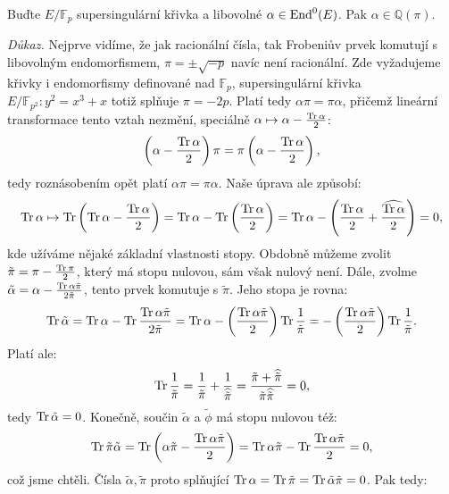 \documentclass[12pt]{report}
\begin{document}
\begin{veta}
Buďte $E/\mathbb{F}_p$ supersingulární křivka a libovolné $\alpha \in \operatorname{End}^0 (E)$. Pak $\alpha \in \mathbb{Q}(\pi)$.
\end{veta}
\noindent \textit{Důkaz.} Nejprve vidíme, že jak racionální čísla, tak Frobeniův prvek komutují s libovolným endomorfismem, $\pi = \pm \sqrt{-p}$ navíc není racionální. Zde vyžadujeme křivky i endomorfismy definované nad $\mathbb{F}_p$, supersingulární křivka $E/\mathbb{F}_{p^2} : y^2 = x^3+x$ totiž splňuje $\pi = -2p$. Platí tedy $\alpha \pi =  \pi \alpha$, přičemž lineární transformace tento vztah nezmění, speciálně $\alpha \mapsto \alpha - \frac{\operatorname{Tr} \alpha}{2}$:
\begin{equation*}
\left( \alpha - \frac{\operatorname{Tr} \alpha}{2} \right) \pi = \pi \left( \alpha - \frac{\operatorname{Tr} \alpha}{2} \right),
\end{equation*}
tedy roznásobením opět platí $\alpha \pi = \pi \alpha$. Naše úprava ale způsobí: $$\operatorname{Tr} \alpha \mapsto \operatorname{Tr} \left(\operatorname{Tr} \alpha - \frac{\operatorname{Tr} \alpha}{2} \right) = \operatorname{Tr} \alpha - \operatorname{Tr} \left( \frac{\operatorname{Tr} \alpha}{2} \right) = \operatorname{Tr} \alpha - \left(\frac{\operatorname{Tr} \alpha}{2} + \frac{\widehat{\operatorname{Tr} \alpha}}{2} \right) = 0,$$
kde užíváme nějaké základní vlastnosti stopy. Obdobně můžeme zvolit $\tilde{\pi} = \pi - \frac{\operatorname{Tr} \pi}{2}$, který má stopu nulovou, sám však nulový není. Dále, zvolme $\tilde{\alpha} = \alpha - \frac{\operatorname{Tr} \alpha \tilde{\pi}}{2 \tilde{\pi}}$, tento prvek komutuje s $\tilde{\pi}$. Jeho stopa je rovna:
\begin{equation*}
\operatorname{Tr} \tilde{\alpha} = \operatorname{Tr} \alpha - \operatorname{Tr} \frac{\operatorname{Tr} \alpha \tilde{\pi}}{2 \tilde{\pi}} = \operatorname{Tr} \alpha - \left( \frac{\operatorname{Tr} \alpha \tilde{\pi}}{2}\right) \operatorname{Tr} \frac{1}{\tilde{\pi}} = -\left( \frac{\operatorname{Tr} \alpha \tilde{\pi}}{2}\right) \operatorname{Tr} \frac{1}{\tilde{\pi}}.
\end{equation*}
Platí ale:
\begin{equation*}
\operatorname{Tr} \frac{1}{\tilde{\pi}} = \frac{1}{\tilde{\pi}} + \frac{1}{\widehat{\tilde{\pi}}} = \frac{\tilde{\pi} + \widehat{\tilde{\pi}}}{\tilde{\pi} \widehat{\tilde{\pi}}} = 0,
\end{equation*}
tedy $\operatorname{Tr} \tilde{\alpha} = 0$. Konečně, součin $\tilde{\alpha}$ a $\tilde{\phi}$ má stopu nulovou též:
\begin{equation*}
\operatorname{Tr} \tilde{\pi} \tilde{\alpha} = \operatorname{Tr} \left( \alpha \tilde{\pi} - \frac{\operatorname{Tr} \alpha \tilde{\pi}}{2} \right) = \operatorname{Tr} \alpha \tilde{\pi} - \operatorname{Tr} \frac{\operatorname{Tr} \alpha \tilde{\pi}}{2} = 0,
\end{equation*}
což jsme chtěli. Čísla $\tilde{\alpha}, \tilde{\pi}$ proto splňující $\operatorname{Tr} \alpha = \operatorname{Tr} \tilde{\pi} = \operatorname{Tr} \tilde{\alpha} \tilde{\pi} = 0$. Pak tedy:
\end{document}
